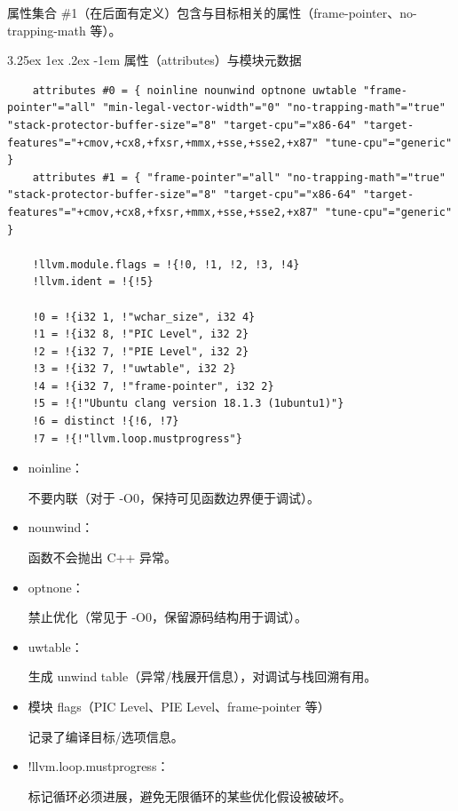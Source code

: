 \documentclass[a4paper]{article}
\makeatletter
\renewcommand\paragraph{\@startsection{paragraph}{5}{\z@}%
	{3.25ex \@plus1ex \@minus.2ex}%
	{-1em}%
	{\normalfont\normalsize\bfseries}}
\makeatother
\begin{document}
属性集合 \#1（在后面有定义）包含与目标相关的属性（frame-pointer、no-trapping-math 等）。

\paragraph{属性（attributes）与模块元数据}
\begin{lstlisting}
	attributes #0 = { noinline nounwind optnone uwtable "frame-pointer"="all" "min-legal-vector-width"="0" "no-trapping-math"="true" "stack-protector-buffer-size"="8" "target-cpu"="x86-64" "target-features"="+cmov,+cx8,+fxsr,+mmx,+sse,+sse2,+x87" "tune-cpu"="generic" }
	attributes #1 = { "frame-pointer"="all" "no-trapping-math"="true" "stack-protector-buffer-size"="8" "target-cpu"="x86-64" "target-features"="+cmov,+cx8,+fxsr,+mmx,+sse,+sse2,+x87" "tune-cpu"="generic" }
	
	!llvm.module.flags = !{!0, !1, !2, !3, !4}
	!llvm.ident = !{!5}
	
	!0 = !{i32 1, !"wchar_size", i32 4}
	!1 = !{i32 8, !"PIC Level", i32 2}
	!2 = !{i32 7, !"PIE Level", i32 2}
	!3 = !{i32 7, !"uwtable", i32 2}
	!4 = !{i32 7, !"frame-pointer", i32 2}
	!5 = !{!"Ubuntu clang version 18.1.3 (1ubuntu1)"}
	!6 = distinct !{!6, !7}
	!7 = !{!"llvm.loop.mustprogress"}
\end{lstlisting}
\begin{itemize}
	\item noinline：
	
	不要内联（对于 -O0，保持可见函数边界便于调试）。
	\item nounwind：
	
	函数不会抛出 C++ 异常。
	\item optnone：
	
	禁止优化（常见于 -O0，保留源码结构用于调试）。
	\item uwtable：
	
	生成 unwind table（异常/栈展开信息），对调试与栈回溯有用。
	\item 模块 flags（PIC Level、PIE Level、frame-pointer 等）
	
	记录了编译目标/选项信息。
	\item !llvm.loop.mustprogress：
	
	标记循环必须进展，避免无限循环的某些优化假设被破坏。
\end{itemize}
\end{document}

